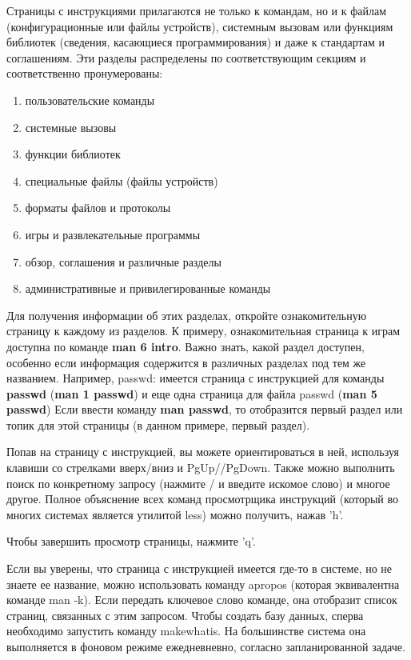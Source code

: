 \documentclass[10pt]{book}
\begin{document}
Страницы с инструкциями прилагаются не только к командам, но и к файлам (конфигурационные или файлы устройств), системным вызовам или функциям библиотек (сведения, касающиеся программирования) и даже к стандартам и соглашениям. Эти разделы распределены по соответствующим секциям и соответственно пронумерованы:

\begin{enumerate}
	\item пользовательские команды
	\item системные вызовы
	\item функции библиотек
	\item специальные файлы (файлы устройств)
	\item форматы файлов и протоколы
	\item игры и развлекательные программы
	\item обзор, соглашения и различные разделы
	\item административные и привилегированные команды
\end{enumerate}

Для получения информации об этих разделах, откройте ознакомительную страницу к каждому из разделов. К примеру, ознакомительная страница к играм доступна по команде \textbf{man 6 intro}. Важно знать, какой раздел доступен, особенно если информация содержится в различных разделах под тем же названием. Например, passwd: имеется страница с инструкцией для команды \textbf{passwd} (\textbf{man 1 passwd}) и еще одна страница для файла passwd (\textbf{man 5 passwd}) Если ввести команду \textbf{man passwd}, то отобразится первый раздел или топик для этой страницы (в данном примере, первый раздел).

Попав на страницу с инструкцией, вы можете ориентироваться в ней, используя клавиши со стрелками вверх/вниз  и PgUp//PgDown. Также можно выполнить поиск по конкретному запросу (нажмите / и введите искомое слово) и многое другое. Полное объяснение всех команд просмотрщика инструкций (который во многих системах является утилитой less) можно получить, нажав 'h'.

Чтобы завершить просмотр страницы, нажмите 'q'.

Если вы уверены, что страница с инструкцией имеется где-то в системе, но не знаете ее название, можно использовать команду apropos (которая эквивалентна команде man -k). Если передать ключевое слово команде, она отобразит список страниц, связанных с этим запросом. Чтобы создать базу данных, сперва необходимо запустить команду makewhatis. На большинстве система она выполняется в фоновом режиме ежедневневно, согласно запланированной задаче.  
\end{document}
